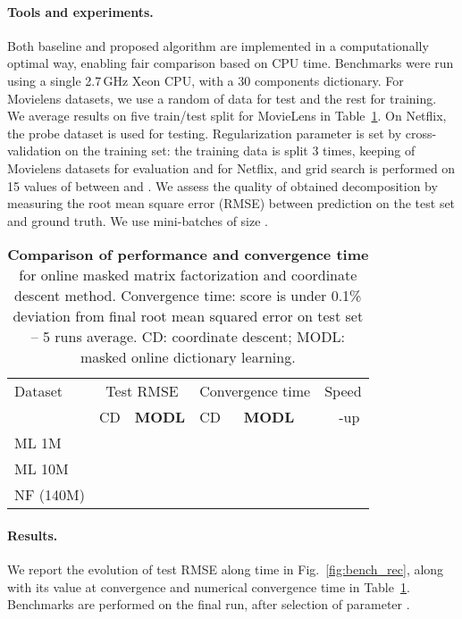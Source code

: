\documentclass{article}
\begin{document}
\paragraph{Tools and experiments.} Both baseline and proposed algorithm are implemented in a
computationally optimal way, enabling fair comparison based on CPU time. Benchmarks were run using a single 2.7\,GHz Xeon CPU, with
 a 30 components dictionary. For Movielens datasets, we use a random
 of data for test and the rest for training. We average results
on five train/test split for MovieLens in Table~\ref{table:rmse}. On Netflix,
the probe dataset is used for testing. Regularization parameter
 is set by cross-validation on the training set: the training
data is split 3 times, keeping  of Movielens datasets for evaluation and  for
Netflix, and grid search is performed on 15 values of  between  and . We assess the
quality of obtained decomposition by measuring the root mean square error
(RMSE) between prediction on the test set and ground truth. We use mini-batches of size .

\begin{table}
	\small \centering \caption{\textbf{Comparison of performance and convergence time} for online masked matrix factorization and coordinate descent method.
	Convergence time: score is under 0.1\% deviation from final root mean squared error on test set -- 5 runs average. CD: coordinate descent; MODL: masked online dictionary learning.
	\label{table:rmse}}
	\vspace{.1in}
	\setlength{\tabcolsep}{5pt}\begin{tabular}{lcclll}
		\toprule
		Dataset  & \multicolumn{2}{c}{Test RMSE} & \multicolumn{2}{c}{Convergence time} & Speed\\
		\cmidrule(r){2-3}\cmidrule(r){4-5}
		  & CD     & \textbf{MODL}               & CD      & \textbf{MODL} & ~~-up\\
		\midrule
		ML 1M    &  &  &  &  & \\
		ML 10M   &  &  &         &  &\\
		NF (140M) &  &  &        &  &  \\
		\bottomrule
	\end{tabular}\vspace{-.2em}
\end{table}

\paragraph{Results.}We report the evolution of test RMSE along time in
Fig.~\ref{fig:bench_rec}, along with its value at convergence and numerical convergence
time in Table~\ref{table:rmse}. Benchmarks are performed on the final run,
after selection of parameter .
\end{document}
